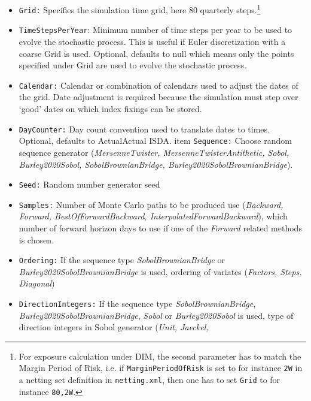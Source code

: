 \begin{itemize}
\item {\tt Grid:} Specifies the simulation time grid, here 80 quarterly steps.\footnote{For exposure calculation under DIM, the second parameter has to match the Margin Period of Risk, i.e. if {\tt MarginPeriodOfRisk} is set to for instance {\tt 2W} in a netting set definition in {\tt netting.xml}, then one has to set {\tt Grid} to for instance {\tt 80,2W}.}
\item {\tt TimeStepsPerYear}: Minimum number of time steps per year to be used to evolve the stochastic process. This is
  useful if Euler discretization with a coarse Grid is used. Optional, defaults to null which means only the points
  specified under Grid are used to evolve the stochastic process.
\item {\tt Calendar:} Calendar or combination of calendars used to adjust the dates of the grid. Date adjustment is
required because the simulation must step over `good' dates on which index fixings can be stored.
\item {\tt DayCounter:} Day count convention used to translate dates to times. Optional, defaults to ActualActual ISDA.
item {\tt Sequence:} Choose random sequence generator ({\em MersenneTwister, MersenneTwisterAntithetic, Sobol,
  Burley2020Sobol, SobolBrownianBridge, Burley2020SobolBrownianBridge}).
\item {\tt Seed:} Random number generator seed
\item {\tt Samples:} Number of Monte Carlo paths to be produced
use ({\em Backward, Forward, BestOfForwardBackward, InterpolatedForwardBackward}), which number of forward horizon days
to use if one of the {\em Forward } related methods is chosen.
\item {\tt Ordering:} If the sequence type {\em SobolBrownianBridge} or {\em Burley2020SobolBrownianBridge} is used,
  ordering of variates ({\em Factors, Steps, Diagonal})
\item {\tt DirectionIntegers:} If the sequence type {\em SobolBrownianBridge}, {\em Burley2020SobolBrownianBridge}, {\em
  Sobol} or {\em Burley2020Sobol} is used, type of direction integers in Sobol generator ({\em Unit, Jaeckel,
}
\end{itemize}
